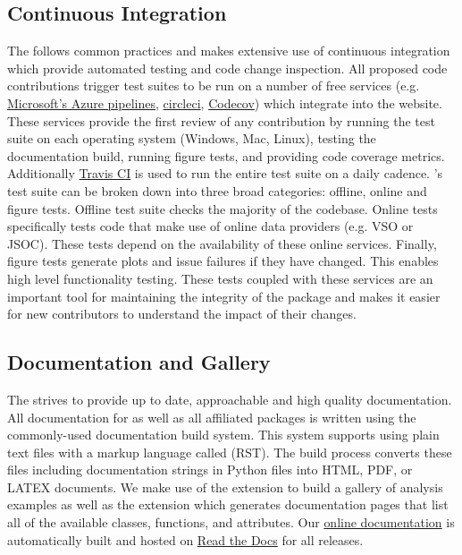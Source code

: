 \subsection{Continuous Integration}
The \sunpyproj follows common practices and makes extensive use of continuous integration which provide automated testing and code change inspection.
All proposed code contributions trigger test suites to be run on a number of free services (e.g.
\href{https://azure.microsoft.com/en-gb/services/devops/pipelines/}{Microsoft's Azure pipelines},
\href{https://circleci.com}{circleci},
\href{https://codecov.io/}{Codecov}) which integrate into the \github website.
These services provide the first review of any contribution by running the test suite on each operating system (Windows, Mac, Linux), testing the documentation build, running figure tests, and providing code coverage metrics.
Additionally \href{https://travis-ci.org}{Travis CI} is used to run the entire test suite on a daily cadence.
\sunpypkg's test suite can be broken down into three broad categories: offline, online and figure tests.
Offline test suite checks the majority of the codebase.
Online tests specifically tests code that make use of online data providers (e.g. VSO or JSOC).
These tests depend on the availability of these online services.
Finally, figure tests generate plots and issue failures if they have changed.
This enables high level functionality testing.
These tests coupled with these services are an important tool for maintaining the integrity of the package and makes it easier for new contributors to understand the impact of their changes.

\subsection{Documentation and Gallery}
The \sunpyproj strives to provide up to date, approachable and high quality documentation.
All documentation for \sunpypkg as well as all affiliated packages is written using the commonly-used  documentation build system.
This system supports using plain text files with a markup language called  (RST).
The build process converts these files including documentation strings in Python files into HTML, PDF, or LATEX documents.
We make use of the  extension to build a gallery of analysis examples as well as the extension  which generates documentation pages that list all of the available classes, functions, and attributes.
Our \href{http://docs.sunpy.org/en/stable/}{online documentation} is automatically built and hosted on \href{https://readthedocs.org/}{Read the Docs} for all releases.
